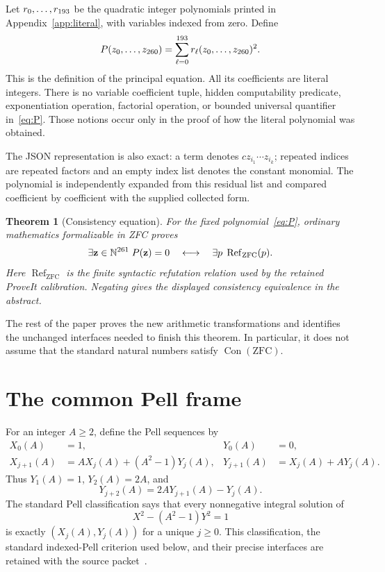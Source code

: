 \documentclass[11pt]{article}
\newtheorem{theorem}{Theorem}[section]
\theoremstyle{definition}\newtheorem{definition}[theorem]{Definition}
\theoremstyle{remark}\newtheorem{remark}[theorem]{Remark}
\newcommand{\N}{\mathbb N}\newcommand{\Z}{\mathbb Z}
\newcommand{\Con}{\operatorname{Con}}\newcommand{\Refut}{\operatorname{Ref}}
\newcommand{\code}[1]{\texttt{\detokenize{#1}}}
\begin{document}
Let $r_0,\ldots,r_{193}$ be the quadratic integer polynomials printed in Appendix~\ref{app:literal}, with variables indexed from zero. Define
\begin{equation}\label{eq:P}
 P(z_0,\ldots,z_{260})
   =\sum_{\ell=0}^{193}r_\ell(z_0,\ldots,z_{260})^2.
\end{equation}
This is the definition of the principal equation. All its coefficients are literal integers. There is no variable coefficient tuple, hidden computability predicate, exponentiation operation, factorial operation, or bounded universal quantifier in~\eqref{eq:P}. Those notions occur only in the proof of how the literal polynomial was obtained.

The JSON representation is also exact: a term \code{[c,[i1,...,ik]]} denotes $c z_{i_1}\cdots z_{i_k}$; repeated indices are repeated factors and an empty index list denotes the constant monomial. The polynomial is independently expanded from this residual list and compared coefficient by coefficient with the supplied collected form.

\begin{theorem}[Consistency equation]\label{thm:main}
For the fixed polynomial~\eqref{eq:P}, ordinary mathematics formalizable in ZFC proves
\[
 \exists\mathbf z\in\N^{\NumVars}\;P(\mathbf z)=0
 \quad\longleftrightarrow\quad
 \exists p\;\Refut_{\mathrm{ZFC}}(p).
\]
Here $\Refut_{\mathrm{ZFC}}$ is the finite syntactic refutation relation used by the retained ProveIt calibration. Negating gives the displayed consistency equivalence in the abstract.
\end{theorem}

The rest of the paper proves the new arithmetic transformations and identifies the unchanged interfaces needed to finish this theorem. In particular, it does not assume that the standard natural numbers satisfy $\Con(\mathrm{ZFC})$.

\section{The common Pell frame}

For an integer $A\ge2$, define the Pell sequences by
\begin{align}
 X_0(A)&=1,&Y_0(A)&=0,\nonumber\\
 X_{j+1}(A)&=A X_j(A)+(A^2-1)Y_j(A),&
 Y_{j+1}(A)&=X_j(A)+A Y_j(A).\label{eq:pellrec}
\end{align}
Thus $Y_1(A)=1$, $Y_2(A)=2A$, and
\begin{equation}\label{eq:secondrec}
 Y_{j+2}(A)=2A Y_{j+1}(A)-Y_j(A).
\end{equation}
The standard Pell classification says that every nonnegative integral solution of
\[
 X^2-(A^2-1)Y^2=1
\]
is exactly $(X_j(A),Y_j(A))$ for a unique $j\ge0$. This classification, the standard indexed-Pell criterion used below, and their precise interfaces are retained with the source packet~\cite{shared,indexed}.
\end{document}
